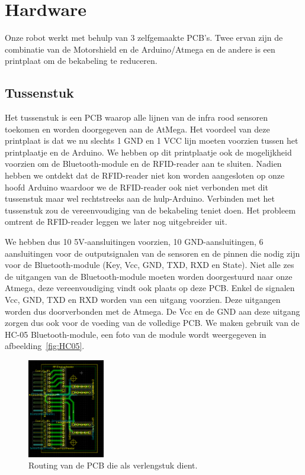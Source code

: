 \chapter{Hardware}
Onze robot werkt met behulp van 3 zelfgemaakte PCB's. Twee ervan zijn de combinatie van de Motorshield en de Arduino/Atmega en de andere is een printplaat om de bekabeling te reduceren.





\section{Tussenstuk}
Het tussenstuk is een PCB waarop alle lijnen van de infra rood sensoren toekomen en worden doorgegeven aan de AtMega. Het voordeel van deze printplaat is dat we nu slechts 1 GND en 1 VCC lijn moeten voorzien tussen het printplaatje en de Arduino. We hebben op dit printplaatje ook de mogelijkheid voorzien om de Bluetooth-module en de RFID-reader aan te sluiten. Nadien hebben we ontdekt dat de RFID-reader niet kon worden aangesloten op onze hoofd Arduino waardoor we de RFID-reader ook niet verbonden met dit tussenstuk maar wel rechtstreeks aan de hulp-Arduino. Verbinden met het tussenstuk zou de vereenvoudiging van de bekabeling teniet doen. Het probleem omtrent de RFID-reader leggen we later nog uitgebreider uit. 






We hebben dus 10 5V-aansluitingen voorzien, 10 GND-aansluitingen, 6 aansluitingen voor de outputsignalen van de sensoren en de pinnen die nodig zijn voor de Bluetooth-module (Key, Vcc, GND, TXD, RXD en State). Niet alle zes de uitgangen van de Bluetooth-module moeten worden doorgestuurd naar onze Atmega, deze vereenvoudiging vindt ook plaats op deze PCB. Enkel de signalen Vcc, GND, TXD en RXD worden van een uitgang voorzien. Deze uitgangen worden dus doorverbonden met de Atmega. De Vcc en de GND aan deze uitgang zorgen dus ook voor de voeding van de volledige PCB. We maken gebruik van de HC-05 Bluetooth-module, een foto van de module wordt weergegeven in afbeelding~\ref{fig:HC05}.
\newpage
\begin{figure}[h]
\centering
\includegraphics[width=0.3\textwidth]{tussenstukPCB.png}
\caption{Routing van de PCB die als verlengstuk dient. \label{tussenstukPCB}}
\end{figure}


